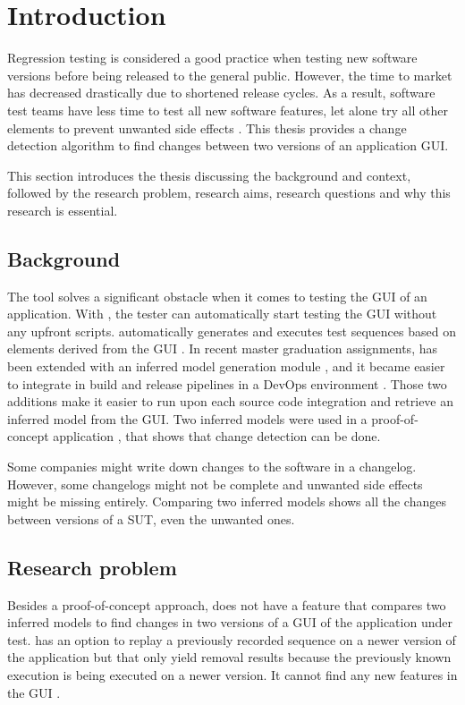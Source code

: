 \chapter{Introduction} \label{chapter:introduction}

Regression testing is considered a good practice when testing new software versions before being released to the general public. 
However, the time to market has decreased drastically due to shortened release cycles. As a result, software test teams have less time to test all new software features, let alone try all other elements to prevent unwanted side effects \cite{rapid-release-cycle-issues}.
This thesis provides a change detection algorithm to find changes between two versions of an application GUI. 

This section introduces the thesis discussing the background and context, followed by the research problem, research aims, research questions and why this research is essential.

\section{Background}
The \testar tool solves a significant obstacle when it comes to testing the GUI of an application. With \testar, the tester can automatically start testing the GUI without any upfront scripts. \testar automatically generates and executes test sequences based on elements derived from the GUI \cite{VosAho2021}. In recent master graduation assignments, \testar has been extended with an inferred model generation module \cite{thesisMulders}, and it became easier to integrate \testar in build and release pipelines in a DevOps environment \cite{thesisSlomp}. Those two additions make it easier to run \testar upon each source code integration and retrieve an inferred model from the GUI. Two inferred models were used in a proof-of-concept application \cite{stateDiff}, that shows that change detection can be done. 

Some companies might write down changes to the software in a changelog. However, some changelogs might not be complete and unwanted side effects might be missing entirely. Comparing two inferred models shows all the changes between versions of a SUT, even the unwanted ones.

\section{Research problem}
Besides a proof-of-concept approach, \testar does not have a feature that compares two inferred models to find changes in two versions of a GUI of the application under test. \testar has an option to replay a previously recorded sequence \cite{testar-manual} on a newer version of the application but that only yield removal results because the previously known execution is being executed on a newer version. It cannot find any new features in the GUI \cite{VosAho2021}.

